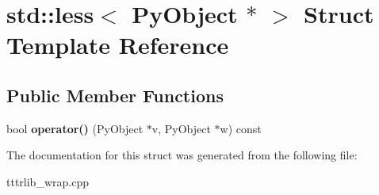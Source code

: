 \hypertarget{structstd_1_1less_3_01_py_object_01_5_01_4}{}\section{std\+:\+:less$<$ Py\+Object $\ast$ $>$ Struct Template Reference}
\label{structstd_1_1less_3_01_py_object_01_5_01_4}
\subsection*{Public Member Functions}
\begin{DoxyCompactItemize}
\item 
\mbox{\label{structstd_1_1less_3_01_py_object_01_5_01_4_ae89d137f05b6d1c8c632ec1c5bf4562d}} 
bool {\bfseries operator()} (Py\+Object $\ast$v, Py\+Object $\ast$w) const
\end{DoxyCompactItemize}


The documentation for this struct was generated from the following file\+:\begin{DoxyCompactItemize}
\item 
tttrlib\+\_\+wrap.\+cpp\end{DoxyCompactItemize}
